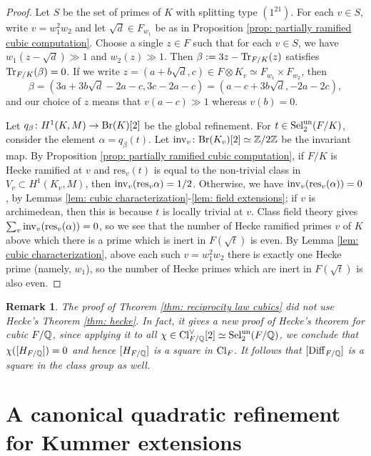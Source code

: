 \documentclass[11pt,a4paper]{amsart}
\def\Z{{\rm \mathbb{Z}}}
\def\Q{{\rm \mathbb{Q}}}
\def\un{{\rm un}}
\def\inv{{\rm inv}}
\def\Tr{{\rm Tr}}
\def\Br{{\rm Br}}
\def\Cl{{\rm Cl}}
\def\Diff{{\rm Diff}}
\def\Sel{{\rm Sel}}
\numberwithin{equation}{section}
\newtheorem{remark}[theorem]{Remark}
\begin{document}
\begin{proof}
    Let $S$ be the set of primes of $K$ with splitting type $(1^21)$.  For each $v \in S$, write $v = w_1^2w_2$ and let $\sqrt{d} \in F_{w_1}$ be as in Proposition \ref{prop: partially ramified cubic computation}. 
 Choose a single $z \in F$ such that for each $v \in S$, we have $w_1(z - \sqrt{d}) \gg 1$ and $w_2(z) \gg 1$. Then $\beta := 3z - \Tr_{F/K}(z)$ satisfies $\Tr_{F/K}(\beta) = 0$.  If we write $z = (a+b\sqrt{d}, c) \in F \otimes K_v \simeq F_{w_1} \times F_{w_2}$, then 
    \[\beta = (3a+3b\sqrt{d} - 2a - c,3c - 2a -c) = (a -c + 3b\sqrt{d}, -2a-2c), \]
    and our choice of $z$ means that $v(a-c) \gg 1$ whereas $v(b) = 0$. 

    Let $q_\beta \colon H^1(K, M) \to \Br(K)[2]$ be the global refinement. For $t \in \Sel_2^\un(F/K)$, consider the element $\alpha = q_\beta(t)$. Let $\inv_v \colon \Br(K_v)[2] \simeq \Z/2\Z$ be the invariant map.  By Proposition \ref{prop: partially ramified cubic computation}, if $F/K$ is Hecke ramified at $v$ and $\mathrm{res}_v(t)$ is equal to the non-trivial class in $V_v \subset H^1(K_v, M)$, then $\inv_v(\mathrm{res}_v\alpha) = 1/2$. Otherwise, we have $\inv_v(\mathrm{res}_v(\alpha)) = 0$, by Lemmas \ref{lem: cubic characterization}-\ref{lem: field extensions}; if $v$ is archimedean, then this is because $t$ is locally trivial at $v$. Class field theory gives $\sum_v \inv_v(\mathrm{res}_v(\alpha)) =0$, so we see that the number of Hecke ramified primes $v$ of $K$ above which there is a prime which is inert in $F(\sqrt{t})$ is even. By Lemma \ref{lem: cubic characterization}, above each such $v = w_1^2w_2$ there is exactly one Hecke prime (namely, $w_1$), so the number of Hecke primes which are inert in $F(\sqrt{t})$ is also even.   
\end{proof}

\begin{remark}
 {\em 
 The proof of Theorem \ref{thm: reciprocity law cubics} did not use Hecke's Theorem \ref{thm: hecke}. In fact, it gives a new proof of Hecke's theorem for cubic $F/\Q$, since applying it to all $ \chi \in \Cl_{F/\Q}^\vee[2] \simeq \Sel_2^\un(F/\Q)$, we conclude that $\chi([H_{F/\Q}]) =0$ and hence $[H_{F/\Q}]$ is a  square in $\Cl_F$. It follows that $[\Diff_{F/\Q}]$ is a square in the class group as well. 
 }   
\end{remark}








\section{A canonical quadratic refinement for Kummer extensions}\label{sec: kummer}
\end{document}
